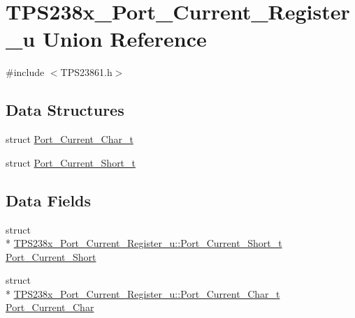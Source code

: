 \hypertarget{union_t_p_s238x___port___current___register__u}{\section{T\-P\-S238x\-\_\-\-Port\-\_\-\-Current\-\_\-\-Register\-\_\-u Union Reference}
\label{union_t_p_s238x___port___current___register__u}
}


{\ttfamily \#include $<$T\-P\-S23861.\-h$>$}

\subsection*{Data Structures}
\begin{DoxyCompactItemize}
\item 
struct \hyperlink{struct_t_p_s238x___port___current___register__u_1_1_port___current___char__t}{Port\-\_\-\-Current\-\_\-\-Char\-\_\-t}
\item 
struct \hyperlink{struct_t_p_s238x___port___current___register__u_1_1_port___current___short__t}{Port\-\_\-\-Current\-\_\-\-Short\-\_\-t}
\end{DoxyCompactItemize}
\subsection*{Data Fields}
\begin{DoxyCompactItemize}
\item 
struct \\*
\hyperlink{struct_t_p_s238x___port___current___register__u_1_1_port___current___short__t}{T\-P\-S238x\-\_\-\-Port\-\_\-\-Current\-\_\-\-Register\-\_\-u\-::\-Port\-\_\-\-Current\-\_\-\-Short\-\_\-t} \hyperlink{union_t_p_s238x___port___current___register__u_a8933f24a22a253977e265c3cd3e1d258}{Port\-\_\-\-Current\-\_\-\-Short}
\item 
struct \\*
\hyperlink{struct_t_p_s238x___port___current___register__u_1_1_port___current___char__t}{T\-P\-S238x\-\_\-\-Port\-\_\-\-Current\-\_\-\-Register\-\_\-u\-::\-Port\-\_\-\-Current\-\_\-\-Char\-\_\-t} \hyperlink{union_t_p_s238x___port___current___register__u_a219a9ef00640068359f9c4f54693eee3}{Port\-\_\-\-Current\-\_\-\-Char}
\end{DoxyCompactItemize}


